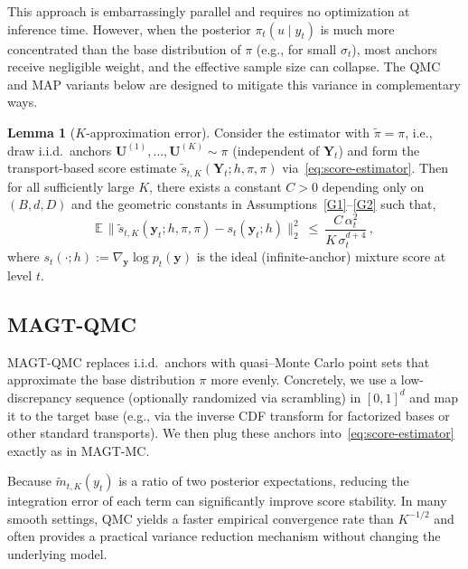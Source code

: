 \documentclass[12pt]{article}
\theoremstyle{definition} %
\newtheorem{lemma}{Lemma}
\newcommand{\Y}{\bm Y}
\newcommand{\y}{\bm y}
\providecommand{\E}{\mathbb{E}}
\providecommand{\method}{MAGT} %
\begin{document}
This approach is embarrassingly parallel and requires no optimization at inference time. However, when the posterior $\pi_t(u\mid y_t)$ is much more concentrated than the base distribution of $\pi$ (e.g., for small $\sigma_t$), most anchors receive negligible weight, and the effective sample size can collapse.  The QMC and MAP variants below are designed to mitigate this variance in complementary ways.


\begin{lemma}[$K$-approximation error]\label{thm:gen}
Consider the estimator with $\tilde\pi=\pi$, i.e., draw i.i.d.\ anchors
$\bm U^{(1)},\dots,\bm U^{(K)}\sim\pi$ (independent of $\Y_t$) and form the transport-based score
estimate $\widetilde s_{t,K}(\Y_t;h,\pi,\pi)$ via~\eqref{eq:score-estimator}.
Then for all sufficiently large $K$, there exists a constant $C>0$ depending only on
$(B,d,D)$ and the geometric constants in Assumptions~\ref{G1}--\ref{G2} such that, 
\begin{equation}\label{eq:K-general}
\E\,
\big\|\widetilde s_{t,K}(\y_t;h,\pi,\pi)-s_t(\y_t;h)\big\|_2^2
\ \le\ \frac{C\,\alpha_t^2}{K\,\sigma_t^{d+4}}\,,
\end{equation}
where $s_t(\cdot;h):=\nabla_{\y}\log p_t(\y)$ is the ideal (infinite-anchor) mixture score at level $t$.
\end{lemma}

\subsection{\method{}-QMC}
\method{}-QMC replaces i.i.d.\ anchors with quasi--Monte Carlo point sets that approximate the base distribution $\pi$ more evenly.
Concretely, we use a low-discrepancy sequence (optionally randomized via scrambling) in $[0,1]^{d}$ and map it to the target base
(e.g., via the inverse CDF transform for factorized bases or other standard transports).
We then plug these anchors into~\eqref{eq:score-estimator} exactly as in \method{}-MC.

Because $\widetilde m_{t,K}(y_t)$ is a ratio of two posterior expectations, reducing the integration error of each term can significantly improve score stability.
In many smooth settings, QMC yields a faster empirical convergence rate than $K^{-1/2}$ and often provides a practical variance reduction mechanism without changing the underlying model.
\end{document}
